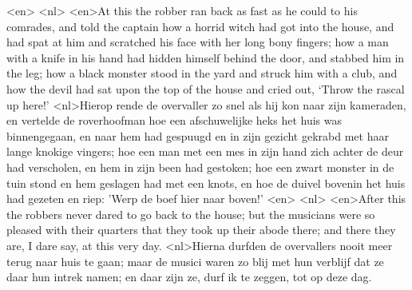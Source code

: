 <en>
<nl>
<en>At this the robber ran back as fast as he could to his comrades, and told the captain how a horrid witch had got into the house, and had spat at him and scratched his face with her long bony fingers; how a man with a knife in his hand had hidden himself behind the door, and stabbed him in the leg; how a black monster stood in the yard and struck him with a club, and how the devil had sat upon the top of the house and cried out, ‘Throw the rascal up here!’
<nl>Hierop rende de overvaller zo snel als hij kon naar zijn kameraden, en vertelde de roverhoofman hoe een afschuwelijke heks het huis was binnengegaan, en naar hem had gespuugd en in zijn gezicht gekrabd met haar lange knokige vingers; hoe een man met een mes in zijn hand zich achter de deur had verscholen, en hem in zijn been had gestoken; hoe een zwart monster in de tuin stond en hem geslagen had met een knots, en hoe de duivel bovenin het huis had gezeten en riep: 'Werp de boef hier naar boven!'
<en>
<nl>
<en>After this the robbers never dared to go back to the house; but the musicians were so pleased with their quarters that they took up their abode there; and there they are, I dare say, at this very day.
<nl>Hierna durfden de overvallers nooit meer terug naar huis te gaan; maar de musici waren zo blij met hun  verblijf dat ze daar hun intrek namen; en daar zijn ze, durf ik te zeggen, tot op deze dag.
